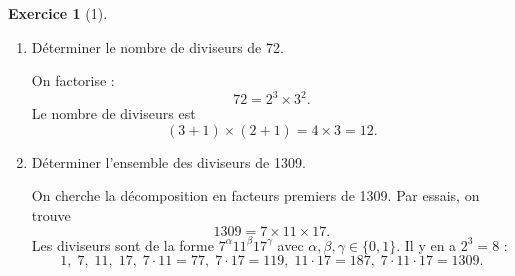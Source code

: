 \documentclass{article}
\theoremstyle{definition}
\newtheorem{exercice}{Exercice}
\begin{document}
\begin{exercice}[1]
\begin{enumerate}
 \item Déterminer le nombre de diviseurs de 72.

 On factorise :
 \[72 = 2^3 \times 3^2.\]
 Le nombre de diviseurs est
 \[(3+1)\times(2+1)=4\times3=12.
 \]
 \item Déterminer l'ensemble des diviseurs de 1309.

 On cherche la décomposition en facteurs premiers de 1309.
 Par essais, on trouve
 \[1309 = 7 \times 11 \times 17.
 \]
 Les diviseurs sont de la forme $7^\alpha11^\beta17^\gamma$ avec $\alpha,\beta,\gamma\in\{0,1\}$. Il y en a $2^3=8$ :
 \[1,\;7,\;11,\;17,\;7\cdot11=77,\;7\cdot17=119,\;11\cdot17=187,\;7\cdot11\cdot17=1309.\]
\end{enumerate}
\end{exercice}
\end{document}
